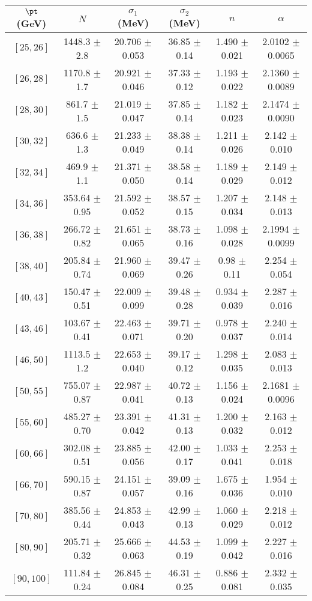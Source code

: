 \begin{tabular}{c||c|c|c|c|c}
$\pt$ (GeV) & $N$ & $\sigma_1$ (MeV) & $\sigma_2$ (MeV) & $n$ & $\alpha$ \\
\hline
$[25, 26]$ & 1448.3 $\pm$ 2.8 & 20.706 $\pm$ 0.053 & 36.85 $\pm$ 0.14 & 1.490 $\pm$ 0.021 & 2.0102 $\pm$ 0.0065\\
$[26, 28]$ & 1170.8 $\pm$ 1.7 & 20.921 $\pm$ 0.046 & 37.33 $\pm$ 0.12 & 1.193 $\pm$ 0.022 & 2.1360 $\pm$ 0.0089\\
$[28, 30]$ & 861.7 $\pm$ 1.5 & 21.019 $\pm$ 0.047 & 37.85 $\pm$ 0.14 & 1.182 $\pm$ 0.023 & 2.1474 $\pm$ 0.0090\\
$[30, 32]$ & 636.6 $\pm$ 1.3 & 21.233 $\pm$ 0.049 & 38.38 $\pm$ 0.14 & 1.211 $\pm$ 0.026 & 2.142 $\pm$ 0.010\\
$[32, 34]$ & 469.9 $\pm$ 1.1 & 21.371 $\pm$ 0.050 & 38.58 $\pm$ 0.14 & 1.189 $\pm$ 0.029 & 2.149 $\pm$ 0.012\\
$[34, 36]$ & 353.64 $\pm$ 0.95 & 21.592 $\pm$ 0.052 & 38.57 $\pm$ 0.15 & 1.207 $\pm$ 0.034 & 2.148 $\pm$ 0.013\\
$[36, 38]$ & 266.72 $\pm$ 0.82 & 21.651 $\pm$ 0.065 & 38.73 $\pm$ 0.16 & 1.098 $\pm$ 0.028 & 2.1994 $\pm$ 0.0099\\
$[38, 40]$ & 205.84 $\pm$ 0.74 & 21.960 $\pm$ 0.069 & 39.47 $\pm$ 0.26 & 0.98 $\pm$ 0.11 & 2.254 $\pm$ 0.054\\
$[40, 43]$ & 150.47 $\pm$ 0.51 & 22.009 $\pm$ 0.099 & 39.48 $\pm$ 0.28 & 0.934 $\pm$ 0.039 & 2.287 $\pm$ 0.016\\
$[43, 46]$ & 103.67 $\pm$ 0.41 & 22.463 $\pm$ 0.071 & 39.71 $\pm$ 0.20 & 0.978 $\pm$ 0.037 & 2.240 $\pm$ 0.014\\
$[46, 50]$ & 1113.5 $\pm$ 1.2 & 22.653 $\pm$ 0.040 & 39.17 $\pm$ 0.12 & 1.298 $\pm$ 0.035 & 2.083 $\pm$ 0.013\\
$[50, 55]$ & 755.07 $\pm$ 0.87 & 22.987 $\pm$ 0.041 & 40.72 $\pm$ 0.13 & 1.156 $\pm$ 0.024 & 2.1681 $\pm$ 0.0096\\
$[55, 60]$ & 485.27 $\pm$ 0.70 & 23.391 $\pm$ 0.042 & 41.31 $\pm$ 0.13 & 1.200 $\pm$ 0.032 & 2.163 $\pm$ 0.012\\
$[60, 66]$ & 302.08 $\pm$ 0.51 & 23.885 $\pm$ 0.056 & 42.00 $\pm$ 0.17 & 1.033 $\pm$ 0.041 & 2.253 $\pm$ 0.018\\
$[66, 70]$ & 590.15 $\pm$ 0.87 & 24.151 $\pm$ 0.057 & 39.09 $\pm$ 0.16 & 1.675 $\pm$ 0.036 & 1.954 $\pm$ 0.010\\
$[70, 80]$ & 385.56 $\pm$ 0.44 & 24.853 $\pm$ 0.043 & 42.99 $\pm$ 0.13 & 1.060 $\pm$ 0.029 & 2.218 $\pm$ 0.012\\
$[80, 90]$ & 205.71 $\pm$ 0.32 & 25.666 $\pm$ 0.063 & 44.53 $\pm$ 0.19 & 1.099 $\pm$ 0.042 & 2.227 $\pm$ 0.016\\
$[90, 100]$ & 111.84 $\pm$ 0.24 & 26.845 $\pm$ 0.084 & 46.31 $\pm$ 0.25 & 0.886 $\pm$ 0.081 & 2.332 $\pm$ 0.035\\
\end{tabular}
